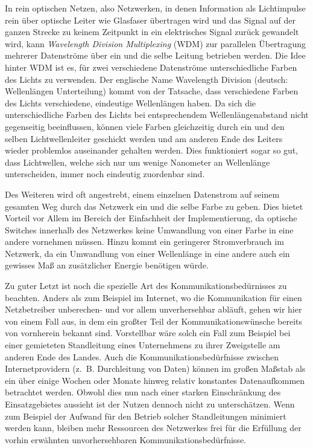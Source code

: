 In rein optischen Netzen, also Netzwerken, in denen Information als Lichtimpulse rein über optische Leiter wie Glasfaser übertragen wird und das Signal auf der ganzen Strecke zu keinem Zeitpunkt in ein elektrisches Signal zurück gewandelt wird, kann \textit{Wavelength Division Multiplexing} (WDM) zur parallelen Übertragung mehrerer Datenströme über ein und die selbe Leitung betrieben werden. Die Idee hinter WDM ist es, für zwei verschiedene Datenströme unterschiedliche Farben des Lichts zu verwenden. Der englische Name Wavelength Division (deutsch: Wellenlängen Unterteilung) kommt von der Tatsache, dass verschiedene Farben des Lichts verschiedene, eindeutige Wellenlängen haben. Da sich die unterschiedliche Farben des Lichts bei entsprechendem Wellenlängenabstand nicht gegenseitig beeinflussen, können viele Farben gleichzeitig durch ein und den selben Lichtwellenleiter geschickt werden und am anderen Ende des Leiters wieder problemlos auseinander gehalten werden. Dies funktioniert sogar so gut, dass Lichtwellen, welche sich nur um wenige Nanometer an Wellenlänge unterscheiden, immer noch eindeutig zuordenbar sind.

Des Weiteren wird oft angestrebt, einem einzelnen Datenstrom auf seinem gesamten Weg durch das Netzwerk ein und die selbe Farbe zu geben. Dies bietet Vorteil vor Allem im Bereich der Einfachheit der Implementierung, da optische Switches innerhalb des Netzwerkes keine Umwandlung von einer Farbe in eine andere vornehmen müssen. Hinzu kommt ein geringerer Stromverbrauch im Netzwerk, da ein Umwandlung von einer Wellenlänge in eine andere auch ein gewisses Maß an zusätzlicher Energie benötigen würde.

Zu guter Letzt ist noch die spezielle Art des Kommunikationsbedürnisses zu beachten. Anders als zum Beispiel im Internet, wo die Kommunikation für einen Netzbetreiber unberechen- und vor allem unverhersehbar abläuft, gehen wir hier von einem Fall aus, in dem ein großter Teil der Kommunikationswünsche bereits von vornherein bekannt sind. Vorstellbar wäre solch ein Fall zum Beispiel bei einer gemieteten Standleitung eines Unternehmens zu ihrer Zweigstelle am anderen Ende des Landes. Auch die Kommunikationsbedürfnisse zwischen Internetprovidern (z.\ B. Durchleitung von Daten) können im großen Maßstab als ein über einige Wochen oder Monate hinweg relativ konstantes Datenaufkommen betrachtet werden. Obwohl dies nun nach einer starken Einschränkung des Einsatzgebietes aussieht ist der Nutzen dennoch nicht zu unterschätzen. Wenn zum Beispiel der Aufwand für den Betrieb solcher Standleitungen minimiert werden kann, bleiben mehr Ressourcen des Netzwerkes frei für die Erfüllung der vorhin erwähnten unvorhersehbaren Kommunikationsbedürfnisse.

